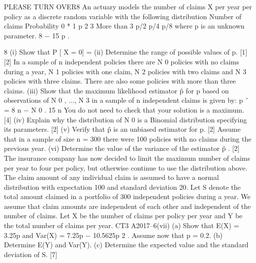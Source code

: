 \documentclass[a4paper,12pt]{article}
\begin{document}
\begin{enumerate}
[Total 8]
PLEASE TURN OVER8
An actuary models the number of claims X per year per policy as a discrete random
variable with the following distribution
Number of claims
Probability
0
*
1
p
2
3 More than 3
p/2 p/4
p/8
where p is an unknown parameter.
8 − 15 p
.

8
(i) Show that P [ X = 0] =
(ii) Determine the range of possible values of p.
[1]
[2]
In a sample of n independent policies there are N 0 policies with no claims during a
year, N 1 policies with one claim, N 2 policies with two claims and N 3 policies with
three claims. There are also some policies with more than three claims.
(iii)
Show that the maximum likelihood estimator p̂ for p based on observations of
N 0 , ..., N 3 in a sample of n independent claims is given by:
p ˆ =
8 n − N 0
.
15 n
You do not need to check that your solution is a maximum.
[4]
(iv) Explain why the distribution of N 0 is a Binomial distribution specifying its
parameters.
[2]
(v) Verify that p̂ is an unbiased estimator for p.
[2]
Assume that in a sample of size n = 300 there were 100 policies with no claims during
the previous year.
(vi)
Determine the value of the variance of the estimator p̂ .
[2]
The insurance company has now decided to limit the maximum number of claims per
year to four per policy, but otherwise continue to use the distribution above. The
claim amount of any individual claim is assumed to have a normal distribution with
expectation 100 and standard deviation 20. Let S denote the total amount claimed in a
portfolio of 300 independent policies during a year. We assume that claim amounts
are independent of each other and independent of the number of claims.
Let X be the number of claims per policy per year and Y be the total number of claims
per year.
CT3 A2017–6(vii)
(a)
Show that E(X) = 3.25p and Var(X) = 7.25p − 10.5625p 2 .
Assume now that p = 0.2.
(b) Determine E(Y) and Var(Y).
(c) Determine the expected value and the standard deviation of S.
[7]


\end{enumerate}
\end{document}
